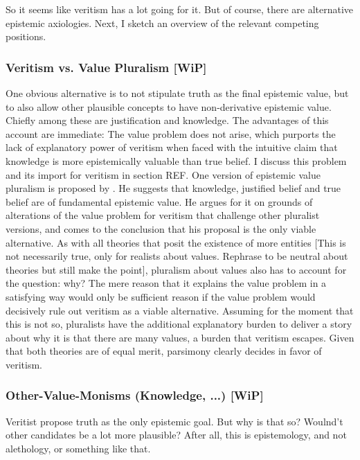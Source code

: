 \documentclass[12pt,numbers=noenddot]{scrartcl}
\begin{document}
So it seems like veritism has a lot going for it. But of course, there are alternative epistemic axiologies. Next, I sketch an overview of the relevant competing positions.

\subsubsection{ Veritism vs. Value Pluralism [WiP]}

One obvious alternative is to not stipulate truth as the final epistemic value, but to also allow other plausible concepts to have non-derivative epistemic value. Chiefly among these are justification and knowledge. The advantages of this account are immediate: The value problem does not arise, which purports the lack of explanatory power of veritism when faced with the intuitive claim that knowledge is more epistemically valuable than true belief. I discuss this problem and its import for veritism in section REF. One version of epistemic value pluralism is proposed by \textcite[399]{Matheson2011-MATHTB-2}. He suggests that knowledge, justified belief and true belief are of fundamental epistemic value. He argues for it on grounds of alterations of the value problem for veritism that challenge other pluralist versions, and comes to the conclusion that his proposal is the only viable alternative.
As with all theories that posit the existence of more entities [This is not necessarily true, only for realists about values. Rephrase to be neutral about theories but still make the point], pluralism about values also has to account for the question: why? The mere reason that it explains the value problem in a satisfying way would only be sufficient reason if the value problem would decisively rule out veritism as a viable alternative. Assuming for the moment that this is not so, pluralists have the additional explanatory burden to deliver a story about why it is that there are many values, a burden that veritism escapes. Given that both theories are of equal merit, parsimony clearly decides in favor of veritism.

\subsubsection{ Other-Value-Monisms (Knowledge, ...) [WiP]}
    Veritist propose truth as the only epistemic goal. But why is that so? Woulnd't other candidates be a lot more plausible? After all, this is epistemology, and not alethology, or something like that.
\end{document}
